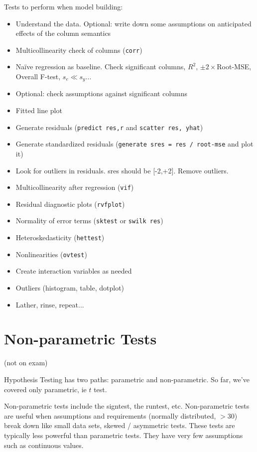 \documentclass[11pt, oneside]{article}   	%
\begin{document}
Tests to perform when model building:
\begin{itemize}
\item{Understand the data. Optional: write down some assumptions on anticipated effects of the column semantics}
\item{Multicollinearity check of columns (\texttt{corr})}
\item{Na{\"i}ve regression as baseline. Check significant columns, $R^2$, $\pm2 \times $Root-MSE, Overall F-test, $s_e \ll s_y$... }
\item{Optional: check assumptions against significant columns}
\item{Fitted line plot}
\item{Generate residuals (\texttt{predict res,r} and \texttt{scatter res, yhat})}
\item{Generate standardized residuals (\texttt{generate sres = res / root-mse} and plot it)}
\item{Look for outliers in residuals. sres should be [-2,+2]. Remove outliers.}
\item{Multicollinearity after regression (\texttt{vif})}
\item{Residual diagnostic plots (\texttt{rvfplot})}
\item{Normality of error terms (\texttt{sktest} or \texttt{swilk res})}
\item{Heteroskedasticity (\texttt{hettest})}
\item{Nonlinearities (\texttt{ovtest})}
\item{Create interaction variables as needed}
\item{Outliers (histogram, table, dotplot)}
\item{Lather, rinse, repeat...}
\end{itemize}

\section{Non-parametric Tests}
(not on exam)

Hypothesis Testing has two paths: parametric and non-parametric. So far, we've covered only parametric, ie $t$ test. 

Non-parametric tests include the signtest, the runtest, etc. Non-parametric tests are useful when assumptions and requirements (normally distributed, $> 30$) break down like small data sets, skewed / asymmetric tests. These tests are typically less powerful than parametric tests. They have very few assumptions such as continuous values.
\end{document}
